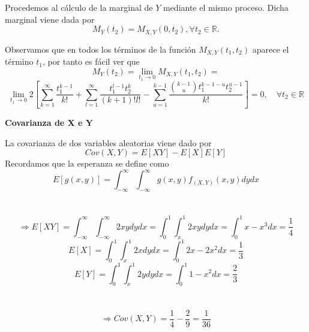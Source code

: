 \documentclass[a4paper, 12pt]{article}
\def\R{\mathds{R}}
\begin{document}
    Procedemos al cálculo de la marginal de $Y$ mediante el mismo proceso. Dicha marginal viene dada por
    $$M_Y(t_2)=M_{X,Y} (0,t_2), \forall t_2 \in \R.$$
    
    Observamos que en todos los términos de la función $M_{X,Y} (t_1,t_2)$ aparece el término $t_1$, por tanto es fácil ver que
    $$M_Y(t_2)=\lim_{t_1\rightarrow 0}M_{X,Y} (t_1,t_2)= $$$$\lim_{t_1\rightarrow 0} 2 \left[\sum_{k=1}^{\infty} \frac{t_1^{k-1}}{k!} + \sum_{l=1}^{\infty} \frac{t_1^{l-1}t_2^k}{(k+1)!l!} - \sum _{u=1}^{k-1} \frac{\binom{k-1}{u} t_1^{k-1-u}t_2^{u-1}}{k!}\right]
    = 0,\quad \forall t_2 \in \R$$

    \newpage

    {\textbf{Covarianza de X e Y}}
    
    La covarianza de dos variables aleatorias viene dado por 
    $$Cov(X,Y)=E[XY]-E[X]E[Y]$$
    Recordamos que la esperanza se define como
    $$E[g(x,y)]=\int _{-\infty}^{\infty} \int _{-\infty}^{\infty} g(x,y) f_{(X,Y)}(x,y)dydx$$\\ \\

    $$\Rightarrow E[XY]= \int _{-\infty}^{\infty} \int _{-\infty}^{\infty} 2xy dydx = \int _{0}^{1} \int _{x}^{1} 2xy dydx = \int _{0}^{1} x-x^3dx=\frac{1}{4}$$
    $$E[X]=\int _{0}^{1} \int _{x}^{1} 2x dydx = \int _{0}^{1} 2x-2x^2 dx = \frac{1}{3}$$
    $$E[Y]=\int _{0}^{1} \int _{x}^{1} 2y dydx = \int _{0}^{1} 1-x^2 dx = \frac{2}{3}$$\\ \\

    $$\Rightarrow Cov(X,Y)=\frac{1}{4}-\frac{2}{9}=\frac{1}{36}$$
\end{document}
